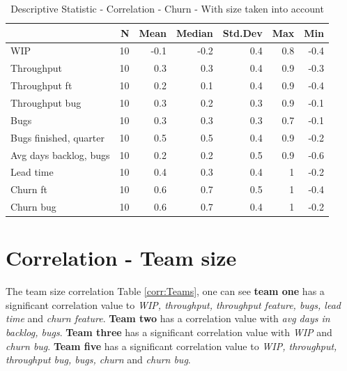 \documentclass[UKenglish]{ifimaster}  %
\begin{document}
\begin{table}[!htbp]
 \centering
 \begin{tabular}{ | l | r | r | r | r | r | r | }
 \hline
& \bf{N} & \bf{Mean} & \bf{Median} & \bf{Std.Dev} & \bf{Max} & \bf{Min} \\ \hline
WIP  & 10 & -0.1 & -0.2 & 0.4 & 0.8 & -0.4\\ \hline
Throughput  & 10 & 0.3 & 0.3 & 0.4 & 0.9 & -0.3\\ \hline
Throughput ft  & 10 & 0.2 & 0.1 & 0.4 & 0.9 & -0.4\\ \hline
Throughput bug  & 10 & 0.3 & 0.2 & 0.3 & 0.9 & -0.1\\ \hline
Bugs  & 10 & 0.3 & 0.3 & 0.3 & 0.7 & -0.1\\ \hline
Bugs finished, quarter  & 10 & 0.5 & 0.5 & 0.4 & 0.9 & -0.2\\ \hline
Avg days backlog, bugs  & 10 & 0.2 & 0.2 & 0.5 & 0.9 & -0.6\\ \hline
Lead time & 10 & 0.4 & 0.3 & 0.4 & 1 & -0.2\\ \hline
Churn ft  & 10 & 0.6 & 0.7 & 0.5 & 1 & -0.4\\ \hline
Churn bug  & 10 & 0.6 & 0.7 & 0.4 & 1 & -0.2\\ \hline

\end{tabular}
 \caption{Descriptive Statistic - Correlation - Churn - With size taken into account}
 \label{DS:corr:churn:v2}
 \end{table}
 
 
 \section{Correlation - Team size}
 \label{sec:corr:tz}
 The team size correlation Table \ref{corr:Teams}, one can see \textbf{team one} has a significant correlation value to \textit{WIP, throughput, throughput feature, bugs, lead time} and \textit{churn feature}. \textbf{Team two} has a correlation value with \textit{avg days in backlog, bugs}. \textbf{Team three} has a significant correlation value with \textit{WIP} and \textit{churn bug}. \textbf{Team five} has a significant correlation value to \textit{WIP, throughput, throughput bug, bugs, churn} and \textit{churn bug}.
\end{document}
